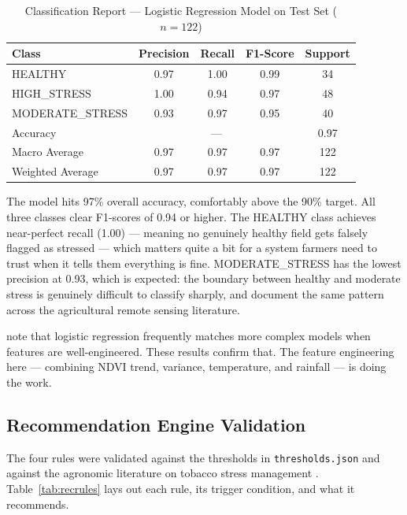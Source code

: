 \begin{table}[H]
  \centering
  \caption{Classification Report — Logistic Regression Model on Test Set ($n = 122$)}
  \label{tab:classreport}
  \begin{tabularx}{\textwidth}{X c c c c}
    \toprule
    \textbf{Class} & \textbf{Precision} & \textbf{Recall} & \textbf{F1-Score} & \textbf{Support} \\
    \midrule
    HEALTHY         & 0.97 & 1.00 & 0.99 & 34 \\
    HIGH\_STRESS    & 1.00 & 0.94 & 0.97 & 48 \\
    MODERATE\_STRESS & 0.93 & 0.97 & 0.95 & 40 \\
    \midrule
    Accuracy        & \multicolumn{3}{c}{---} & 0.97 \\
    Macro Average   & 0.97 & 0.97 & 0.97 & 122 \\
    Weighted Average & 0.97 & 0.97 & 0.97 & 122 \\
    \bottomrule
  \end{tabularx}
\end{table}

The model hits 97\% overall accuracy, comfortably above the 90\% target. All three classes clear F1-scores of 0.94 or higher. The HEALTHY class achieves near-perfect recall (1.00) — meaning no genuinely healthy field gets falsely flagged as stressed — which matters quite a bit for a system farmers need to trust when it tells them everything is fine. MODERATE\_STRESS has the lowest precision at 0.93, which is expected: the boundary between healthy and moderate stress is genuinely difficult to classify sharply, and \citet{weiss2020} document the same pattern across the agricultural remote sensing literature.

\citet{liakos2018} note that logistic regression frequently matches more complex models when features are well-engineered. These results confirm that. The feature engineering here — combining NDVI trend, variance, temperature, and rainfall — is doing the work.

\subsection{Recommendation Engine Validation}

The four rules were validated against the thresholds in \texttt{thresholds.json} and against the agronomic literature on tobacco stress management \citep{nyoka2020}. Table~\ref{tab:recrules} lays out each rule, its trigger condition, and what it recommends.


